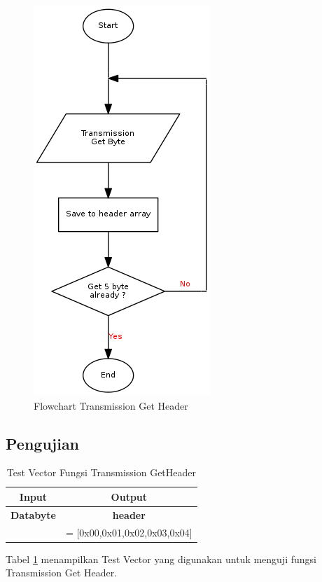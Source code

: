 \begin{figure}[!h]
\centering
\includegraphics[height=0.5\textheight]{image/transmission/flow_getheader.png}
\caption{Flowchart Transmission Get Header}
\label{fig-flow-getheader}
\end{figure}

\subsection {Pengujian}

\begin{table}[h]
  \centering
  \begin{tabular}{ | c || c | }
    \hline
    \bf{Input}  & \bf{Output} \\
    \hline
    \bf{Databyte} & \bf{header}\\
    \hline
    [0x00,0x01,0x02,0x03,0x04,..,0x0f] & = [0x00,0x01,0x02,0x03,0x04] \\
    \hline
  \end{tabular}
  \caption{Test Vector Fungsi Transmission GetHeader}
  \label{tabel-test-getheader}
\end{table}

Tabel \ref{tabel-test-getheader} menampilkan Test Vector yang digunakan untuk menguji fungsi Transmission Get Header.


